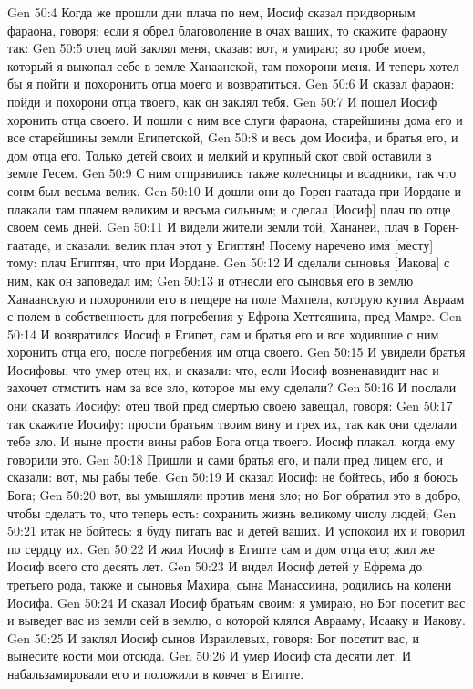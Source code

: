 Gen 50:4  Когда же прошли дни плача по нем, Иосиф сказал придворным фараона, говоря: если я обрел благоволение в очах ваших, то скажите фараону так:
Gen 50:5  отец мой заклял меня, сказав: вот, я умираю; во гробе моем, который я выкопал себе в земле Ханаанской, там похорони меня. И теперь хотел бы я пойти и похоронить отца моего и возвратиться.
Gen 50:6  И сказал фараон: пойди и похорони отца твоего, как он заклял тебя.
Gen 50:7  И пошел Иосиф хоронить отца своего. И пошли с ним все слуги фараона, старейшины дома его и все старейшины земли Египетской,
Gen 50:8  и весь дом Иосифа, и братья его, и дом отца его. Только детей своих и мелкий и крупный скот свой оставили в земле Гесем.
Gen 50:9  С ним отправились также колесницы и всадники, так что сонм был весьма велик.
Gen 50:10  И дошли они до Горен-гаатада при Иордане и плакали там плачем великим и весьма сильным; и сделал [Иосиф] плач по отце своем семь дней.
Gen 50:11  И видели жители земли той, Хананеи, плач в Горен-гаатаде, и сказали: велик плач этот у Египтян! Посему наречено имя [месту] тому: плач Египтян, что при Иордане.
Gen 50:12  И сделали сыновья [Иакова] с ним, как он заповедал им;
Gen 50:13  и отнесли его сыновья его в землю Ханаанскую и похоронили его в пещере на поле Махпела, которую купил Авраам с полем в собственность для погребения у Ефрона Хеттеянина, пред Мамре.
Gen 50:14  И возвратился Иосиф в Египет, сам и братья его и все ходившие с ним хоронить отца его, после погребения им отца своего.
Gen 50:15  И увидели братья Иосифовы, что умер отец их, и сказали: что, если Иосиф возненавидит нас и захочет отмстить нам за все зло, которое мы ему сделали?
Gen 50:16  И послали они сказать Иосифу: отец твой пред смертью своею завещал, говоря:
Gen 50:17  так скажите Иосифу: прости братьям твоим вину и грех их, так как они сделали тебе зло. И ныне прости вины рабов Бога отца твоего. Иосиф плакал, когда ему говорили это.
Gen 50:18  Пришли и сами братья его, и пали пред лицем его, и сказали: вот, мы рабы тебе.
Gen 50:19  И сказал Иосиф: не бойтесь, ибо я боюсь Бога;
Gen 50:20  вот, вы умышляли против меня зло; но Бог обратил это в добро, чтобы сделать то, что теперь есть: сохранить жизнь великому числу людей;
Gen 50:21  итак не бойтесь: я буду питать вас и детей ваших. И успокоил их и говорил по сердцу их.
Gen 50:22  И жил Иосиф в Египте сам и дом отца его; жил же Иосиф всего сто десять лет.
Gen 50:23  И видел Иосиф детей у Ефрема до третьего рода, также и сыновья Махира, сына Манассиина, родились на колени Иосифа.
Gen 50:24  И сказал Иосиф братьям своим: я умираю, но Бог посетит вас и выведет вас из земли сей в землю, о которой клялся Аврааму, Исааку и Иакову.
Gen 50:25  И заклял Иосиф сынов Израилевых, говоря: Бог посетит вас, и вынесите кости мои отсюда.
Gen 50:26  И умер Иосиф ста десяти лет. И набальзамировали его и положили в ковчег в Египте.


